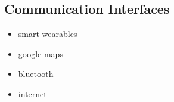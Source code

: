 \documentclass[../../../rasd.tex]{subfiles}
\begin{document}
\subsection{Communication Interfaces}
\begin{itemize}
	\item smart wearables
	\item google maps
	\item bluetooth
	\item internet
\end{itemize}
\end{document}
